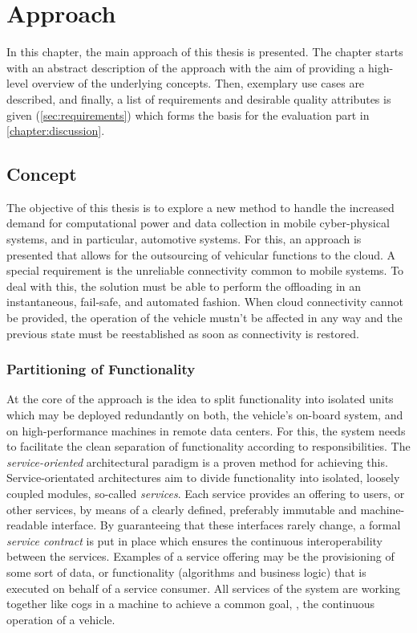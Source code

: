 
\chapter{Approach}\label{chapter:approach}

In this chapter, the main approach of this thesis is presented. The chapter starts with an abstract description of the approach with the aim of providing a high-level overview of the underlying concepts. Then, exemplary use cases are described, and finally, a list of requirements and desirable quality attributes is given (\autoref{sec:requirements}) which forms the basis for the evaluation part in \autoref{chapter:discussion}. 

%
%
%
%
%
%
%
%
%
%

\section{Concept} \label{sec:concept}
The objective of this thesis is to explore a new method to handle the increased demand for computational power and data collection in mobile cyber-physical systems, and in particular, automotive systems. For this, an approach is presented that allows for the outsourcing of vehicular functions to the cloud.
A special requirement is the unreliable connectivity common to mobile systems. To deal with this, the solution must be able to perform the offloading in an instantaneous, fail-safe, and automated fashion. When cloud connectivity cannot be provided, the operation of the vehicle mustn't be affected in any way and the previous state must be reestablished as soon as connectivity is restored.


\subsection{Partitioning of Functionality}
At the core of the approach is the idea to split functionality into isolated units which may be deployed redundantly on both, the vehicle's on-board system, and on high-performance machines in remote data centers. For this, the system needs to facilitate the clean separation of functionality according to responsibilities. The \emph{service-oriented} architectural paradigm \cite{erl2008soa} is a proven method for achieving this. Service-orientated architectures aim to divide functionality into isolated, loosely coupled modules, so-called \emph{services}. Each service provides an offering to users, or other services, by means of a clearly defined, preferably immutable and machine-readable interface. By guaranteeing that these interfaces rarely change, a formal \emph{service contract} is put in place which ensures the continuous interoperability between the services. Examples of a service offering may be the provisioning of some sort of data, or functionality (algorithms and business logic) that is executed on behalf of a service consumer. All services of the system are working together like cogs in a machine to achieve a common goal, \ie , the continuous operation of a vehicle. 


